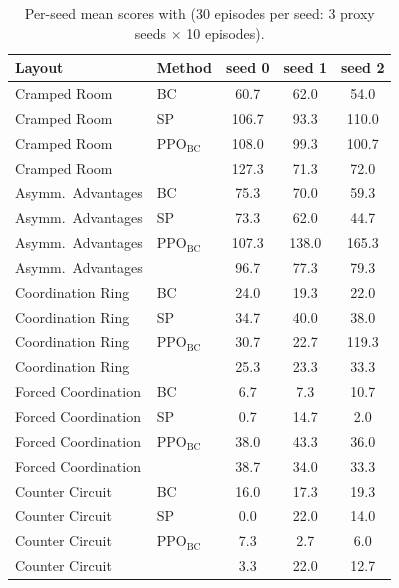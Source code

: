 \begin{table}[h]\centering\caption{Per-seed mean scores with \hproxy{} (30 episodes per seed: 3 proxy seeds $\times$ 10 episodes).}\label{tab:perseed}\small
\begin{tabular}{llccc}
\toprule
Layout & Method & seed 0 & seed 1 & seed 2 \\
\midrule
Cramped Room & BC & 60.7 & 62.0 & 54.0 \\
Cramped Room & SP & 106.7 & 93.3 & 110.0 \\
Cramped Room & PPO$_{\mathrm{BC}}$ & 108.0 & 99.3 & 100.7 \\
Cramped Room & \facet{} & 127.3 & 71.3 & 72.0 \\
Asymm.\ Advantages & BC & 75.3 & 70.0 & 59.3 \\
Asymm.\ Advantages & SP & 73.3 & 62.0 & 44.7 \\
Asymm.\ Advantages & PPO$_{\mathrm{BC}}$ & 107.3 & 138.0 & 165.3 \\
Asymm.\ Advantages & \facet{} & 96.7 & 77.3 & 79.3 \\
Coordination Ring & BC & 24.0 & 19.3 & 22.0 \\
Coordination Ring & SP & 34.7 & 40.0 & 38.0 \\
Coordination Ring & PPO$_{\mathrm{BC}}$ & 30.7 & 22.7 & 119.3 \\
Coordination Ring & \facet{} & 25.3 & 23.3 & 33.3 \\
Forced Coordination & BC & 6.7 & 7.3 & 10.7 \\
Forced Coordination & SP & 0.7 & 14.7 & 2.0 \\
Forced Coordination & PPO$_{\mathrm{BC}}$ & 38.0 & 43.3 & 36.0 \\
Forced Coordination & \facet{} & 38.7 & 34.0 & 33.3 \\
Counter Circuit & BC & 16.0 & 17.3 & 19.3 \\
Counter Circuit & SP & 0.0 & 22.0 & 14.0 \\
Counter Circuit & PPO$_{\mathrm{BC}}$ & 7.3 & 2.7 & 6.0 \\
Counter Circuit & \facet{} & 3.3 & 22.0 & 12.7 \\
\bottomrule
\end{tabular}\end{table}